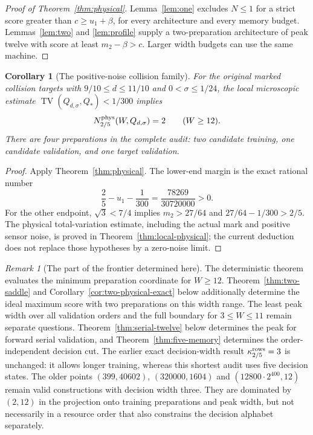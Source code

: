 \documentclass[11pt]{amsart}
\newtheorem{corollary}[theorem]{Corollary}
\theoremstyle{definition}\newtheorem{definition}[theorem]{Definition}
\theoremstyle{remark}\newtheorem{remark}[theorem]{Remark}
\newcommand{\TV}{\operatorname{TV}}
\newcommand{\1}{\mathbf 1}
\newcommand{\Qstar}{Q_*}
\begin{document}
\begin{proof}[Proof of Theorem~\ref{thm:physical}]
Lemma~\ref{lem:one} excludes $N\le1$ for a strict score greater than
$c\ge u_1+\beta$, for every architecture and every memory budget.
Lemmas~\ref{lem:two} and \ref{lem:profile} supply a two-preparation
architecture of peak twelve with score at least $m_2-\beta>c$.
Larger width budgets can use the same machine.
\end{proof}

\begin{corollary}[The positive-noise collision family]\label{cor:collision}
For the original marked collision targets with
$9/10\le d\le11/10$ and $0<\sigma\le1/24$, the local microscopic
estimate $\TV(Q_{d,\sigma},\Qstar)<1/300$ implies
\[
             N_{2/5}^{\rm phys}(W,Q_{d,\sigma})=2
                         \qquad(W\ge12).
\]
There are four preparations in the complete audit: two candidate training,
one candidate validation, and one target validation.
\end{corollary}
\begin{proof}
Apply Theorem~\ref{thm:physical}. The lower-end margin is the exact rational
number
\[
 \frac25-u_1-\frac1{300}=\frac{78269}{30720000}>0.
\]
For the other endpoint, $\sqrt3<7/4$ implies
$m_2>27/64$ and $27/64-1/300>2/5$.
The physical total-variation estimate, including the actual mark and
positive sensor noise, is proved in Theorem~\ref{thm:local-physical}; the current deduction
does not replace those hypotheses by a zero-noise limit.
\end{proof}

\begin{remark}[The part of the frontier determined here]
The deterministic theorem evaluates the minimum preparation coordinate
for $W\ge12$. Theorem~\ref{thm:two-saddle} and
Corollary~\ref{cor:two-physical-exact} below additionally determine the
ideal maximum score with two preparations on this width range. The
least peak width over all validation orders and the full boundary for
$3\le W\le11$ remain separate questions. Theorem~\ref{thm:serial-twelve}
below determines the peak for forward serial validation, and
Theorem~\ref{thm:five-memory} determines the order-independent decision cut.
The earlier exact decision-width result $\kappa_{2/5}^{\rm rows}=3$
is unchanged: it allows longer training, whereas this shortest audit
uses five decision states. The older points $(399,40602)$,
$(320000,1604)$ and $(12800\cdot2^{400},12)$ remain valid constructions
with decision width three. They are dominated by $(2,12)$ in the
projection onto training preparations and peak width, but not necessarily
in a resource order that also constrains the decision alphabet separately.
\end{remark}
\end{document}
